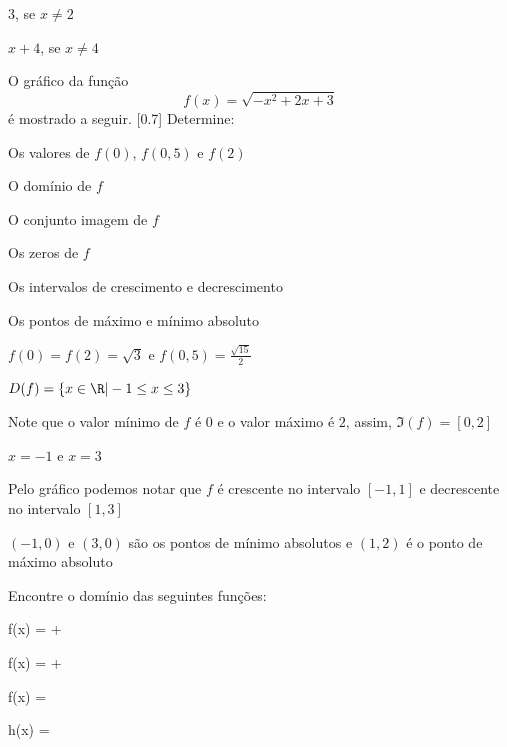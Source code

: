 \begin{exercises*}
\begin{exercise}
  \begin{answer}
    \begin{alphalist}
      \item 3,     se $x \neq 2$
      \item $x+4$, se $x \neq 4$
    \end{alphalist}
  \end{answer}
\end{exercise}

\begin{exercise}
  O gráfico da função
  \[
    f(x)= \sqrt{-x^2+2x+3}
  \]
  é mostrado a seguir.
  [0.7]
  Determine:
  \begin{alphalist}
    \item Os valores de $f(0)$, $f(0,5)$ e $f(2)$
    \item O domínio de $f$
    \item O conjunto imagem de $f$
    \item Os zeros de $f$
    \item Os intervalos de crescimento e decrescimento
    \item Os pontos de máximo e mínimo absoluto
  \end{alphalist}

  \begin{answer}
    \begin{alphalist}
      \item $f(0)=f(2)= \sqrt{3}$ e $f(0,5)=\frac{\sqrt{15}}{2}$
      \item $D(f)= \{ x \in \R | -1 \leq x \leq 3\}$
      \item Note que o valor mínimo de $f$ é $0$ e o valor máximo é $2$, assim,
            $\Im(f)= [0,2]$
      \item $x=-1$ e $x=3$
      \item Pelo gráfico podemos notar que $f$ é crescente no intervalo $[-1, 1]$
            e decrescente no intervalo $[1,3]$
      \item $(-1,0)$ e $(3,0)$ são os pontos de mínimo absolutos e $(1,2)$
            é o ponto de máximo absoluto
    \end{alphalist}
  \end{answer}
\end{exercise}

\begin{exercise}
  Encontre o domínio das seguintes funções:
  \begin{mathlist}
    \item f(x) = + 
    \item f(x) = + 
    \item f(x) = 
    \item h(x) = 
  \end{mathlist}


\end{exercise}
\end{exercises*}

